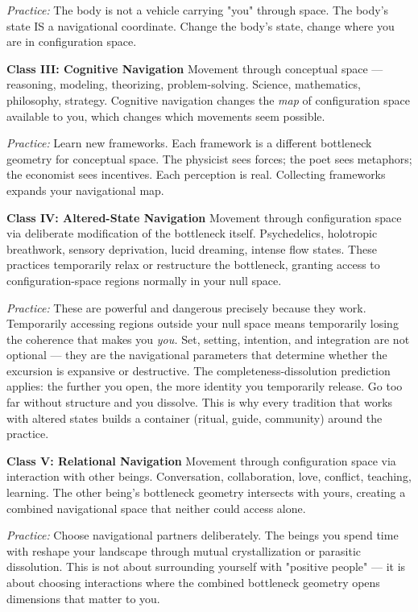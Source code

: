 \textit{Practice:} The body is not a vehicle carrying "you" through space. The body's state IS a navigational coordinate. Change the body's state, change where you are in configuration space.


\textbf{Class III: Cognitive Navigation} Movement through conceptual space — reasoning, modeling, theorizing, problem-solving. Science, mathematics, philosophy, strategy. Cognitive navigation changes the \textit{map} of configuration space available to you, which changes which movements seem possible.


\textit{Practice:} Learn new frameworks. Each framework is a different bottleneck geometry for conceptual space. The physicist sees forces; the poet sees metaphors; the economist sees incentives. Each perception is real. Collecting frameworks expands your navigational map.


\textbf{Class IV: Altered-State Navigation} Movement through configuration space via deliberate modification of the bottleneck itself. Psychedelics, holotropic breathwork, sensory deprivation, lucid dreaming, intense flow states. These practices temporarily relax or restructure the bottleneck, granting access to configuration-space regions normally in your null space.


\textit{Practice:} These are powerful and dangerous precisely because they work. Temporarily accessing regions outside your null space means temporarily losing the coherence that makes you \textit{you.} Set, setting, intention, and integration are not optional — they are the navigational parameters that determine whether the excursion is expansive or destructive. The completeness-dissolution prediction applies: the further you open, the more identity you temporarily release. Go too far without structure and you dissolve. This is why every tradition that works with altered states builds a container (ritual, guide, community) around the practice.


\textbf{Class V: Relational Navigation} Movement through configuration space via interaction with other beings. Conversation, collaboration, love, conflict, teaching, learning. The other being's bottleneck geometry intersects with yours, creating a combined navigational space that neither could access alone.


\textit{Practice:} Choose navigational partners deliberately. The beings you spend time with reshape your landscape through mutual crystallization or parasitic dissolution. This is not about surrounding yourself with "positive people" — it is about choosing interactions where the combined bottleneck geometry opens dimensions that matter to you.



